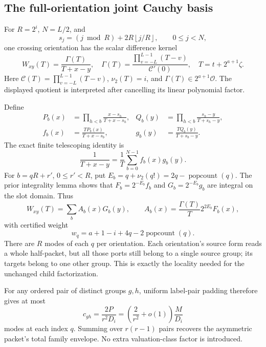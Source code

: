 \documentclass[11pt]{article}
\theoremstyle{definition}\newtheorem{definition}[theorem]{Definition}
\theoremstyle{remark}\newtheorem{remark}[theorem]{Remark}
\newcommand{\OO}{\mathcal O}
\newcommand{\vv}{\nu_2}
\newcommand{\pc}{\operatorname{popcount}}
\newcommand{\floor}[1]{\left\lfloor#1\right\rfloor}
\begin{document}
\subsection{The full-orientation joint Cauchy basis}

For $R=2^i$, $N=L/2$, and
\[
 s_j=(j\bmod R)+2R\floor{j/R},\qquad 0\le j<N,
\]
one crossing orientation has the scalar difference kernel
\[
 W_{xy}(T)=\frac{\Gamma(T)}{T+x-y},\quad
 \Gamma(T)=\frac{\prod_{v=-L}^{L-1}(T-v)}{\mathcal C'(0)},\quad
 T=t+2^{a+1}\zeta.
\]
Here $\mathcal C(T)=\prod_{v=-L}^{L-1}(T-v)$, $\vv(T)=i$, and
$\Gamma(T)\in2^{a+1}\OO$. The displayed quotient is interpreted after
cancelling its linear polynomial factor.

Define
\begin{align*}
 P_b(x)&=\prod_{h<b}\frac{x-s_h}{T+x-s_h},&
 Q_b(y)&=\prod_{h<b}\frac{s_h-y}{T+s_h-y},\\
 f_b(x)&=\frac{TP_b(x)}{T+x-s_b},&
 g_b(y)&=\frac{TQ_b(y)}{T+s_b-y}.
\end{align*}
The exact finite telescoping identity is
\begin{equation}
 \frac1{T+x-y}=\frac1T\sum_{b=0}^{N-1}f_b(x)g_b(y).\label{eq:cauchy}
\end{equation}
For $b=qR+r'$, $0\le r'<R$, put $E_b=q+\vv(q!)=2q-\pc(q)$.
The prior integrality lemma shows that
$F_b=2^{-E_b}f_b$ and $G_b=2^{-E_b}g_b$ are integral on the slot domain.
Thus
\begin{equation}
 W_{xy}(T)=\sum_b A_b(x)G_b(y),\qquad
 A_b(x)=\frac{\Gamma(T)}T2^{2E_b}F_b(x),\label{eq:features}
\end{equation}
with certified weight
\begin{equation}
 w_q=a+1-i+4q-2\pc(q).\label{eq:weights}
\end{equation}
There are $R$ modes of each $q$ per orientation. Each orientation's source
form reads a whole half-packet, but all those ports still belong to a single
source group; its targets belong to one other group. This is exactly the
locality needed for the unchanged child factorization.

For any ordered pair of distinct groups $g,h$, uniform label-pair padding
therefore gives at most
\begin{equation}
 c_{gh}=\frac{2P}{r^2D_i}
 =\left(\frac2{r^2}+o(1)\right)\frac M{D_i}\label{eq:pair-colors}
\end{equation}
modes at each index $q$. Summing over $r(r-1)$ pairs recovers the asymmetric
packet's total family envelope. No extra valuation-class factor is introduced.
\end{document}
